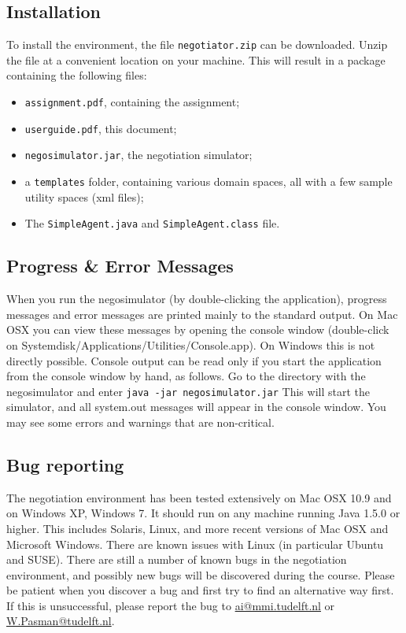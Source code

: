 \documentclass[]{article}
\begin{document}
\subsection{Installation}
To install the environment, the file \texttt{negotiator.zip} can be downloaded. Unzip the file at a convenient location on your machine. This will result in a package containing the following files:

\begin{itemize}
	\item \texttt{assignment.pdf}, containing the assignment;
	\item \texttt{userguide.pdf}, this document;
	\item \texttt{negosimulator.jar}, the negotiation simulator;
	\item a \texttt{templates} folder, containing various domain spaces, all with a few sample utility spaces (xml files);
	\item The \texttt{SimpleAgent.java} and \texttt{SimpleAgent.class} file.
\end{itemize}

\subsection{Progress \& Error Messages}
When you run the negosimulator (by double-clicking the application), progress messages and error messages are printed mainly to the standard output. On Mac OSX you can view these messages by opening the console window (double-click on Systemdisk/Applications/Utilities/Console.app). On Windows this is not directly possible. Console output can be read only if you start the application from the console window by hand, as follows. Go to the directory with the negosimulator and enter
\texttt{java -jar negosimulator.jar}
This will start the simulator, and all system.out messages will appear in the console window. You may see some errors and warnings that are non-critical.

\subsection{Bug reporting}
The negotiation environment has been tested extensively on Mac OSX 10.9 and on Windows XP, Windows 7. It should run on any machine running Java 1.5.0 or higher. This includes Solaris, Linux, and more recent versions of Mac OSX and Microsoft Windows. There are known issues with Linux (in particular Ubuntu and SUSE). There are still a number of known bugs in the negotiation environment, and possibly new bugs will be discovered during the course. Please be patient when you discover a bug and first try to find an alternative way first. If this is unsuccessful, please report the bug to \url{ai@mmi.tudelft.nl} or \url{W.Pasman@tudelft.nl}.
 
\end{document}
